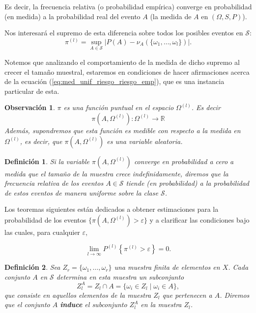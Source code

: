 \documentclass{report}
\newtheorem{dfn}{Definición}[section]
\newtheorem{obs}{Observación}[section]
\begin{document}
Es decir, la frecuencia relativa (o probabilidad empírica) converge en probabilidad (en medida) a la probabilidad real del evento $A$ (la medida de $A$ en $(\Omega, S, P)$).\newline

Nos interesará el supremo de esta diferencia sobre todos los posibles eventos en $\mathcal{S}$:
\begin{equation}
    \pi^{(l)} = \sup_{A\in\mathcal{S}} |P(A)-\nu_A(\{\omega_1,\dots, \omega_l\})|. \label{def: funcion pi}
\end{equation}

Notemos que analizando el comportamiento de la medida de dicho supremo al crecer el tamaño muestral, 
estaremos en condiciones de hacer afirmaciones acerca de la ecuación (\ref{eq:med_unif_riesgo_riesgo_emp}),
que es una instancia particular de esta.\newline

\begin{obs}
$\pi$ es una función puntual en el espacio \( \Omega^{(l)} \). Es decir
\[ \pi(A, \Omega^{(l)}): \Omega^{(l)} \rightarrow \mathbb{R}
\]
Además, supondremos que esta función es medible con respecto a la medida en \( \Omega^{(l)} \), 
es decir, que \( \pi(A, \Omega^{(l)}) \) es una variable aleatoria.
\end{obs} 
\begin{dfn}
Si la variable \( \pi(A, \Omega^{(l)}) \) converge en probabilidad a cero a medida que 
el tamaño de la muestra crece indefinidamente, diremos que la frecuencia relativa 
de los eventos \( A \in \mathcal{S} \) tiende (en probabilidad) a la probabilidad 
de estos eventos de manera \emph{uniforme} sobre la clase \( \mathcal{S} \).
\end{dfn}


Los teoremas siguientes están dedicados a obtener estimaciones para la probabilidad 
de los eventos \( \{ \pi(A, \Omega^{(l)}) > \varepsilon \} \) y a clarificar las condiciones 
bajo las cuales, para cualquier \( \varepsilon \),

\[
\lim_{l \to \infty} P^{(l)}\left\{\pi^{(l)} > \varepsilon\right\} = 0.
\]
\bigskip


\begin{dfn}
Sea \( Z_r = \{\omega_1, \dots, \omega_r\} \) una muestra finita de elementos en \( X \). 
Cada conjunto \( A \) en \( \mathcal{S} \) determina en esta muestra un subconjunto 
\[ 
    Z_l^A = Z_l \cap A = \{\omega_i \in Z_l \mid \omega_i \in A\}, 
\]
que consiste en aquellos elementos de la 
muestra \( Z_l \) que pertenecen a \( A \). Diremos que el conjunto \( A \) \textbf{induce} 
el subconjunto \( Z_l^A  \) en la muestra \( Z_l \).
\end{dfn}
\bigskip
\end{document}
